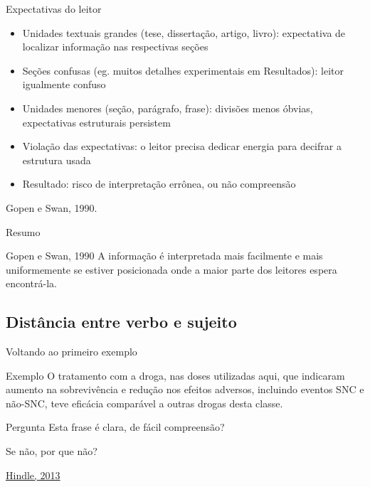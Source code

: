 \documentclass{beamer}
\begin{document}
\begin{frame}{Expectativas do leitor}
  \begin{itemize}
    \footnotesize
  \item<1-> Unidades textuais grandes (tese, dissertação, artigo, livro):
    \alert<-2>{expectativa} de localizar informação nas respectivas
    seções
    \medskip
  \item<2-> Seções confusas (eg. muitos detalhes experimentais em
    Resultados): leitor igualmente confuso
    \medskip
  \item<3-> Unidades menores (seção, parágrafo, frase): divisões menos
    óbvias, \alert<3>{expectativas estruturais persistem}
    \medskip
  \item<4-> Violação das expectativas: o \alert{leitor precisa dedicar
      energia} para decifrar a estrutura usada
    \medskip
  \item<5-> Resultado: risco de interpretação errônea, ou não compreensão
  \end{itemize}

\vfill
Gopen e Swan, 1990.
\end{frame}

\begin{frame}{Resumo}
  \begin{block}{Gopen e Swan, 1990}
    A informação é interpretada mais facilmente e mais uniformemente
    se estiver posicionada onde a maior parte dos leitores espera
    encontrá-la.
  \end{block}
\end{frame}

\subsection{Distância entre verbo e sujeito}

\begin{frame}{Voltando ao primeiro exemplo}
  \begin{exampleblock}{Exemplo}
    \footnotesize
    O \alert<2>{tratamento com a droga}, nas doses utilizadas aqui, que
    indicaram aumento na sobrevivência e redução nos efeitos adversos,
    incluindo eventos SNC e não-SNC, \alert<2>{teve} eficácia
    comparável a outras drogas desta classe.
  \end{exampleblock}

  \begin{block}{Pergunta}
    \scriptsize
    Esta frase é clara, de fácil compreensão?

    \bigskip
    Se não, por que não?
  \end{block}

  \vfill
  \scriptsize
  \hfill \href{https://web.archive.org/web/20150512001938/http://www.edanzediting.com/blog/reader_expectations_subject_verb_placement}
  {Hindle, 2013}
\end{frame}
\end{document}
